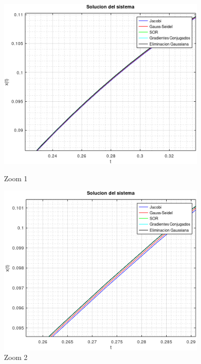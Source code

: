 \documentclass[11pt]{article}
\begin{document}
\begin{figure}[!h]
	\centering
	\begin{minipage}{0.45\textwidth}
		\centering
		\includegraphics[width=0.9\textwidth]{SoluciondDelSistema1.png} %
		\caption{Zoom 1}
	\end{minipage}\hfill
	\begin{minipage}{0.45\textwidth}
		\centering
		\includegraphics[width=0.9\textwidth]{SoluciondDelSistema2.png} %
		\caption{Zoom 2}
	\end{minipage}
\end{figure}
\end{document}

